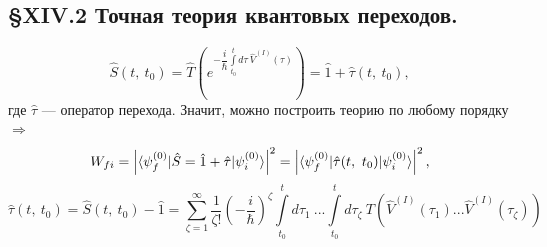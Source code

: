 \subsection{\S XIV.2 Точная теория квантовых переходов.}
\[
\hat{S}(t,~t_0) = \hat{T} \left(e^{-\dfrac{i}{\hbar}\int\limits_{t_0}^t d\tau~\hat{V}^{(I)}(\tau)}\right) = \hat{1} + \hat{\tau}(t,~t_0),
\]
где $\hat{\tau}$ --- оператор перехода. Значит, можно построить теорию по любому порядку $\Longrightarrow$
\[
W_{fi} = \left| \langle \psi_f^{(0)} | \hat{S} = \hat{1} + \hat{\tau} | \psi_i^{(0)} \rangle \right|^2 = \left| \langle \psi_f^{(0)} | \hat{\tau}(t,~t_0) | \psi_i^{(0)} \rangle \right|^2 ,
\]
\[
\hat{\tau}(t,~t_0) = \hat{S}(t,~t_0) - \hat{1} = \sum\limits_{\zeta = 1}^\infty \dfrac{1}{\zeta !}\left(-\dfrac{i}{\hbar}\right)^\zeta \int\limits_{t_0}^t d\tau_1~ ... \int\limits_{t_0}^t d\tau_\zeta~ T(\hat{V}^{(I)}(\tau_1)...\hat{V}^{(I)}(\tau_\zeta))
\]



